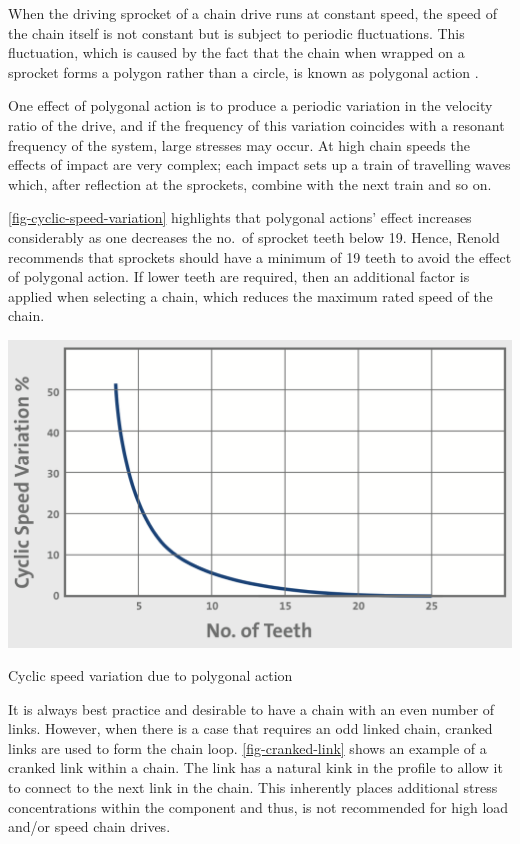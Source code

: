 When the driving sprocket of a chain drive runs at constant speed, the speed of the chain itself is not constant but is subject to periodic fluctuations. This fluctuation, which is caused by the fact that the chain when wrapped on a sprocket forms a polygon rather than a circle, is known as polygonal action .

One effect of polygonal action is to produce a periodic variation in the velocity ratio of the drive, and if the frequency of this variation coincides with a resonant frequency of the system, large stresses may occur. At high chain speeds the effects of impact are very complex; each impact sets up a train of travelling waves which, after reflection at the sprockets, combine with the next train and so on.

\cref{fig-cyclic-speed-variation} highlights that polygonal actions' effect increases considerably as one decreases the no.\ of sprocket teeth below 19. Hence, Renold recommends that sprockets should have a minimum of 19 teeth to avoid the effect of polygonal action. If lower teeth are required, then an additional factor is applied when selecting a chain, which reduces the maximum rated speed of the chain.

\begin{marginfigure}
    \centering
    \includegraphics[width=\textwidth]{07_transmission_selection/polygonal-action.png}
    \caption[Cyclic speed variation due to polygonal action]{Cyclic speed variation due to polygonal action \cite[][p.24]{renoldchain}}
    \label{fig-cyclic-speed-variation}
\end{marginfigure}

It is always best practice and desirable to have a chain with an even number of links. However, when there is a case that requires an odd linked chain, cranked links are used to form the chain loop. \cref{fig-cranked-link} shows an example of a cranked link within a chain. The link has a natural kink in the profile to allow it to connect to the next link in the chain. This inherently places additional stress concentrations within the component and thus, is not recommended for high load and/or speed chain drives.


